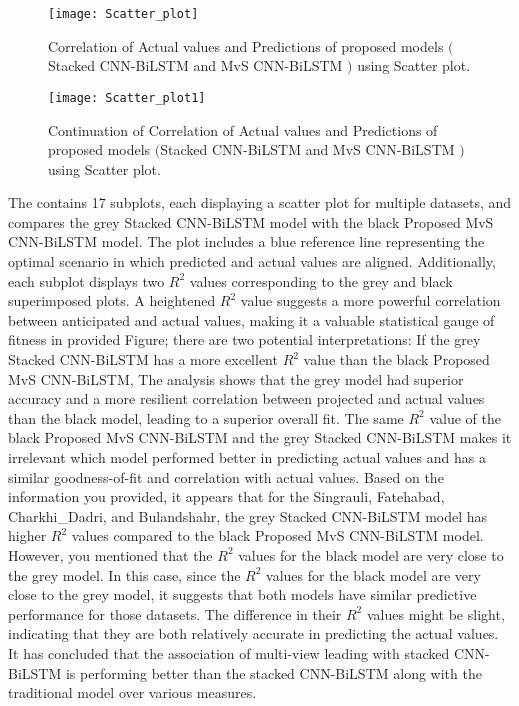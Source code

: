 \begin{figure}[ht]
	\centering
		\texttt{[image: Scatter\_plot]}
	  \caption{Correlation of Actual values and Predictions of proposed models $($Stacked CNN-BiLSTM and MvS CNN-BiLSTM $)$ using Scatter plot.}\label{Scatter}
\end{figure}
\begin{figure}[ht]
	\centering
		\texttt{[image: Scatter\_plot1]}
	  \caption{Continuation of Correlation of Actual values and Predictions of proposed models $($Stacked CNN-BiLSTM and MvS CNN-BiLSTM $)$ using Scatter plot.}\label{Scatter1}
\end{figure}
The  contains 17 subplots,  each displaying a scatter plot for multiple datasets,  and compares the grey Stacked CNN-BiLSTM model with the black Proposed MvS CNN-BiLSTM model. The plot includes a blue reference line representing the optimal scenario in which predicted and actual values are aligned. Additionally,  each subplot displays two $R^2$ values corresponding to the grey and black superimposed plots. A heightened $R^2$ value suggests a more powerful correlation between anticipated and actual values,  making it a valuable statistical gauge of fitness in provided Figure; there are two potential interpretations:  If the grey Stacked CNN-BiLSTM has a more excellent $R^2$ value than the black Proposed MvS CNN-BiLSTM,  The analysis shows that the grey model had superior accuracy and a more resilient correlation between projected and actual values than the black model,  leading to a superior overall fit. The same $R^2$ value of the black Proposed MvS CNN-BiLSTM and the grey Stacked CNN-BiLSTM makes it irrelevant which model performed better in predicting actual values and has a similar goodness-of-fit and correlation with actual values. Based on the information you provided,  it appears that for the  Singrauli,  Fatehabad,  Charkhi\_Dadri,  and Bulandshahr,  the grey Stacked CNN-BiLSTM model has higher $R^2$ values compared to the black Proposed MvS CNN-BiLSTM model. However,  you mentioned that the $R^2$ values for the black model are very close to the grey model. In this case,  since the $R^2$ values for the black model are very close to the grey model,  it suggests that both models have similar predictive performance for those datasets. The difference in their $R^2$ values might be slight,  indicating that they are both relatively accurate in predicting the actual values. It has concluded that the association of multi-view leading with stacked CNN-BiLSTM is performing better than the stacked CNN-BiLSTM along with the traditional model over various measures.


